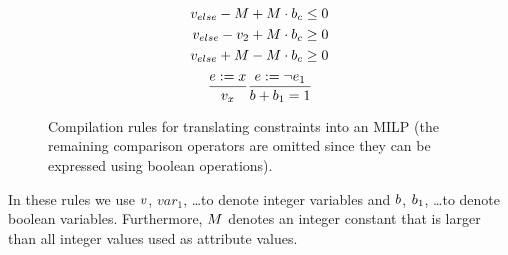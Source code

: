 {\begin{figure}[t]
\begin{minipage}{0.49\linewidth}
\[{\begin{aligned}
        v_{else} - M + M \cdot b_{c}          & \leq 0 \\
        v_{else} - v_2 + M \cdot b_{c}            & \geq 0 \\
        v_{else} + M - M \cdot b_{c}          & \geq 0
      \end{aligned}
    }
  \]
  \begin{gather*}
    \frac{e := x}{v_{x}}
     \frac{e := \neg e_1 }{
      b + b_1 =1
    }
  \end{gather*}
  \end{minipage}

  \caption{Compilation rules for translating constraints into an MILP (the remaining comparison operators are omitted since they can be expressed using boolean operations).}
  \label{fig:milp-compilation}
\end{figure}

In these rules we use $v$, $var_1$, \ldots to denote integer variables and $b$, $b_1$, \ldots to denote boolean variables. Furthermore, $M$ denotes an integer constant that is larger than all integer values used as attribute values.
}


